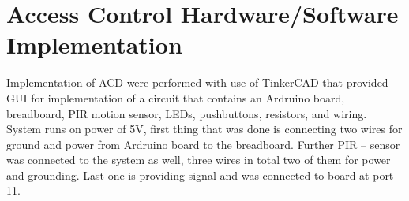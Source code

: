 \section{Access Control Hardware/Software Implementation}
\label{sec:ACD_implementation}

Implementation of ACD were performed with use of TinkerCAD that provided GUI for implementation of a circuit that contains an Ardruino board, breadboard, PIR motion sensor, LEDs, pushbuttons, resistors, and wiring. System runs on power of 5V, first thing that was done is connecting two wires for ground and power from Ardruino board to the breadboard. Further PIR – sensor was connected to the system as well, three wires in total two of them for power and grounding. Last one is providing signal and was connected to board at port 11.
\newline\newline

